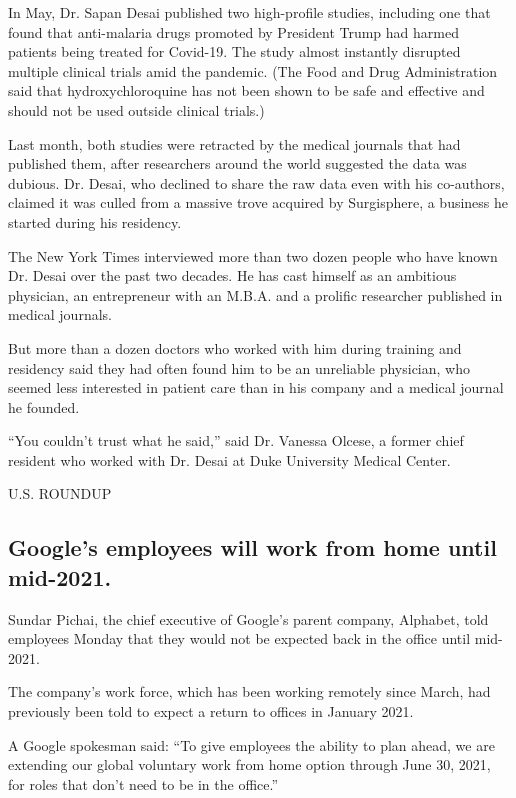 In May, Dr. Sapan Desai published two high-profile studies, including
one that found that anti-malaria drugs promoted by President Trump had
harmed patients being treated for Covid-19. The study almost instantly
disrupted multiple clinical trials amid the pandemic. (The Food and Drug
Administration said that hydroxychloroquine has not been shown to be
safe and effective and should not be used outside clinical trials.)

Last month, both studies were retracted by the medical journals that had
published them, after researchers around the world suggested the data
was dubious. Dr. Desai, who declined to share the raw data even with his
co-authors, claimed it was culled from a massive trove acquired by
Surgisphere, a business he started during his residency.

The New York Times interviewed more than two dozen people who have known
Dr. Desai over the past two decades. He has cast himself as an ambitious
physician, an entrepreneur with an M.B.A. and a prolific researcher
published in medical journals.

But more than a dozen doctors who worked with him during training and
residency said they had often found him to be an unreliable physician,
who seemed less interested in patient care than in his company and a
medical journal he founded.

``You couldn't trust what he said,'' said Dr. Vanessa Olcese, a former
chief resident who worked with Dr. Desai at Duke University Medical
Center.

U.S. ROUNDUP

\hypertarget{googles-employees-will-work-from-home-until-mid-2021}{%
\subsection{Google's employees will work from home until
mid-2021.}\label{googles-employees-will-work-from-home-until-mid-2021}}

Sundar Pichai, the chief executive of Google's parent company, Alphabet,
told employees Monday that they would not be expected back in the office
until mid-2021.

The company's work force, which has been working remotely since March,
had previously been told to expect a return to offices in January 2021.

A Google spokesman said: ``To give employees the ability to plan ahead,
we are extending our global voluntary work from home option through June
30, 2021, for roles that don't need to be in the office.''


